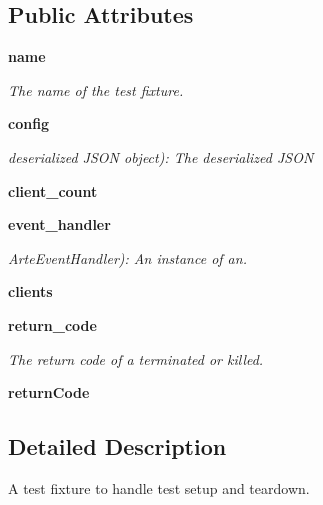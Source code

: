 \subsection*{Public Attributes}
\begin{DoxyCompactItemize}
\item 
{\bf name}
\begin{DoxyCompactList}\small\item\em The name of the test fixture. \end{DoxyCompactList}\item 
{\bf config}\label{classarte__test_1_1_arte_test_fixture_a7e447fee46d5124e5d7ba9797ecc4120}

\begin{DoxyCompactList}\small\item\em deserialized J\+S\+ON object)\+: The deserialized J\+S\+ON \end{DoxyCompactList}\item 
{\bfseries client\+\_\+count}\label{classarte__test_1_1_arte_test_fixture_ac02585f8f6c1fa8cae84ac394002bc84}

\item 
{\bf event\+\_\+handler}\label{classarte__test_1_1_arte_test_fixture_acbd27814c30171ebeb3bc3b0dd2d7978}

\begin{DoxyCompactList}\small\item\em Arte\+Event\+Handler)\+: An instance of an. \end{DoxyCompactList}\item 
{\bfseries clients}\label{classarte__test_1_1_arte_test_fixture_a0ce25bc979d417989f0ae2d4d30e828b}

\item 
{\bf return\+\_\+code}\label{classarte__test_1_1_arte_test_fixture_a0d9a1e9ef871ed25068a91f2d693e6be}

\begin{DoxyCompactList}\small\item\em The return code of a terminated or killed. \end{DoxyCompactList}\item 
{\bfseries return\+Code}\label{classarte__test_1_1_arte_test_fixture_a27442f942d329a4d3b8ef348fabb79b6}

\end{DoxyCompactItemize}


\subsection{Detailed Description}
A test fixture to handle test setup and teardown. 

